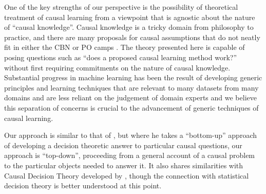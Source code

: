 One of the key strengths of our perspective is the possibility of theoretical treatment of causal learning from a viewpoint that is agnostic about the nature of ``causal knowledge''. Causal knowledge is a tricky domain from philosophy to practice, and there are many proposals for causal assumptions that do not neatly fit in either the CBN or PO camps \citep{bongers_theoretical_2016,dawid_beware_2010,bengio_meta-transfer_2019}. The theory presented here is capable of posing questions such as ``does a proposed causal learning method work?'' without first requiring commitments on the nature of causal knowledge. Substantial progress in machine learning has been the result of developing generic principles and learning techniques that are relevant to many datasets from many domains and are less reliant on the judgement of domain experts and we believe this separation of concerns is crucial to the advancement of generic techniques of causal learning.

Our approach is similar to that of \citet{dawid_decision-theoretic_2012}, but where he takes a ``bottom-up'' approach of developing a decision theoretic answer to particular causal questions, our approach is ``top-down'', proceeding from a general account of a causal problem to the particular objects needed to answer it. It also shares similarities with Causal Decision Theory developed by \cite{lewis_causal_1981}, though the connection with statistical decision theory is better understood at this point.





